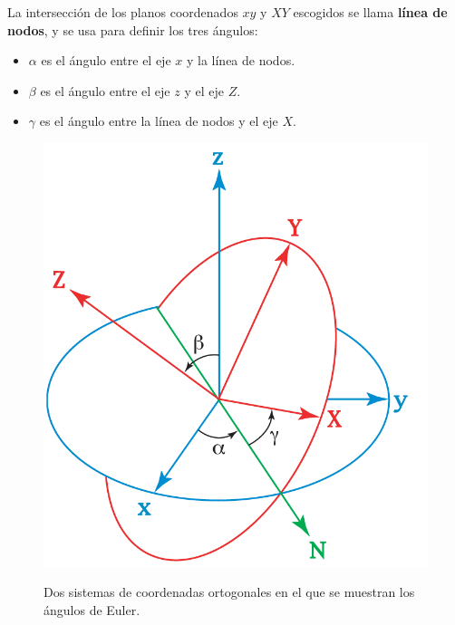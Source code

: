La intersección de los planos coordenados $xy$ y $XY$ escogidos se llama \textbf{línea de nodos}, y se usa para definir los tres ángulos:

\begin{itemize}
	\item $\alpha$ es el ángulo entre el eje $x$ y la línea de nodos.
	\item $\beta$ es el ángulo entre el eje $z$ y el eje $Z$.
	\item $\gamma$ es el ángulo entre la línea de nodos y el eje $X$.
\end{itemize}


\begin{figure}
	\centering
	\includegraphics[scale=0.25]{./img/angulosEuler.png}
	\label{angulosEuler}
	\caption{Dos sistemas de coordenadas ortogonales en el que se muestran los ángulos de Euler.}
\end{figure}














